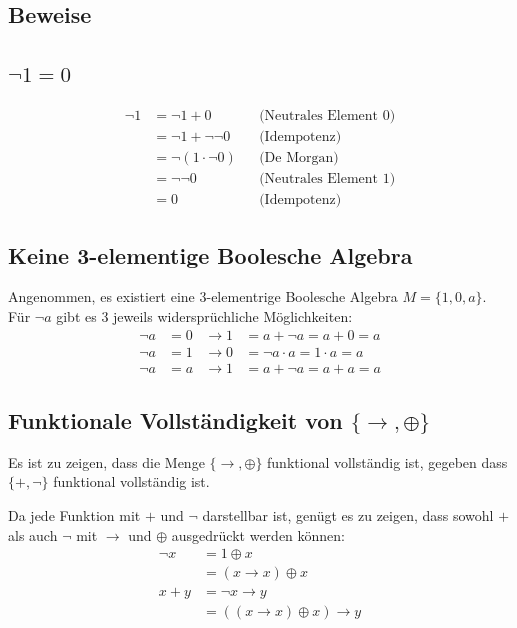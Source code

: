 \documentclass[a4paper,6pt]{article}
\begin{document}
\begin{multicols*}{3}
\section{Beweise}

\subsection*{$\lnot1 = 0$}
\begin{align*}
\lnot1 &= \lnot1 + 0 && \text{(Neutrales Element 0)} \\
   &= \lnot1 + \lnot\lnot0 && \text{(Idempotenz)} \\
   &= \lnot(1 \cdot \lnot0) && \text{(De Morgan)} \\
   &= \lnot\lnot0 && \text{(Neutrales Element 1)} \\
   &= 0 && \text{(Idempotenz)}
\end{align*}

\subsection*{Keine 3-elementige Boolesche Algebra}
Angenommen, es existiert eine 3-elementrige Boolesche Algebra $ M = \{1, 0, a\} $. Für $ \neg a $ gibt es 3 jeweils widersprüchliche Möglichkeiten:
\begin{align*}
\neg a &= 0 & \rightarrow 1 &= a + \neg a = a + 0 = a \\
\neg a &= 1 & \rightarrow 0 &= \neg a \cdot a = 1 \cdot a = a \\
\neg a &= a & \rightarrow 1 &= a + \neg a = a + a = a
\end{align*}

\subsection*{Funktionale Vollständigkeit von $\{\rightarrow, \oplus\}$}
Es ist zu zeigen, dass die Menge $\{\rightarrow, \oplus\}$ funktional vollständig ist, gegeben dass $\{+, \neg\}$ funktional vollständig ist.

Da jede Funktion mit $+$ und $\neg$ darstellbar ist, genügt es zu zeigen, dass sowohl $+$ als auch $\neg$ mit $\rightarrow$ und $\oplus$ ausgedrückt werden können:
\begin{align*}
\neg x &= 1 \oplus x \\
       &= (x \rightarrow x) \oplus x \\
x + y &= \neg x \rightarrow y \\
       &= ((x \rightarrow x) \oplus x) \rightarrow y
\end{align*}


\end{multicols*}
\end{document}
